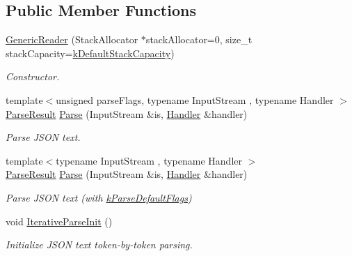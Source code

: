 \subsection*{Public Member Functions}
\begin{DoxyCompactItemize}
\item 
\mbox{\hyperlink{classrapidjson_1_1_generic_reader_a56ab1065ea75167aeacb4802425bf57f}{Generic\+Reader}} (Stack\+Allocator $\ast$stack\+Allocator=0, size\+\_\+t stack\+Capacity=\mbox{\hyperlink{classrapidjson_1_1_generic_reader_a963c65fe821dac21448caa3930788161}{k\+Default\+Stack\+Capacity}})
\begin{DoxyCompactList}\small\item\em Constructor. \end{DoxyCompactList}\item 
{\footnotesize template$<$unsigned parse\+Flags, typename Input\+Stream , typename Handler $>$ }\\\mbox{\hyperlink{structrapidjson_1_1_parse_result}{Parse\+Result}} \mbox{\hyperlink{classrapidjson_1_1_generic_reader_ac9c540b77de19661f6f45e04b9b0937b}{Parse}} (Input\+Stream \&is, \mbox{\hyperlink{classrapidjson_1_1_handler}{Handler}} \&handler)
\begin{DoxyCompactList}\small\item\em Parse J\+S\+ON text. \end{DoxyCompactList}\item 
{\footnotesize template$<$typename Input\+Stream , typename Handler $>$ }\\\mbox{\hyperlink{structrapidjson_1_1_parse_result}{Parse\+Result}} \mbox{\hyperlink{classrapidjson_1_1_generic_reader_a2bac14d193873d661d79ad000473a908}{Parse}} (Input\+Stream \&is, \mbox{\hyperlink{classrapidjson_1_1_handler}{Handler}} \&handler)
\begin{DoxyCompactList}\small\item\em Parse J\+S\+ON text (with \mbox{\hyperlink{namespacerapidjson_a81379eb4e94a0386d71d15fda882ebc9a5640cb00db7814b7f22be3683dda9835}{k\+Parse\+Default\+Flags}}) \end{DoxyCompactList}\item 
void \mbox{\hyperlink{classrapidjson_1_1_generic_reader_a90403a2c55dadf82fd2bb9d4c66b3280}{Iterative\+Parse\+Init}} ()
\begin{DoxyCompactList}\small\item\em Initialize J\+S\+ON text token-\/by-\/token parsing. \end{DoxyCompactList}\item 

\end{DoxyCompactItemize}
